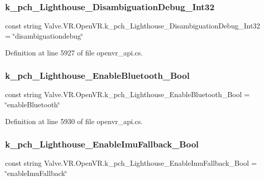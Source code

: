 \subsubsection{\texorpdfstring{k\_pch\_Lighthouse\_DisambiguationDebug\_Int32}{k\_pch\_Lighthouse\_DisambiguationDebug\_Int32}}
{\footnotesize\ttfamily const string Valve.\+V\+R.\+Open\+V\+R.\+k\+\_\+pch\+\_\+\+Lighthouse\+\_\+\+Disambiguation\+Debug\+\_\+\+Int32 = \char`\"{}disambiguationdebug\char`\"{}}



Definition at line 5927 of file openvr\+\_\+api.\+cs.

\mbox{\label{class_valve_1_1_v_r_1_1_open_v_r_ad04a088975dfea94ba6fa8d2b0f29c22}} 
\subsubsection{\texorpdfstring{k\_pch\_Lighthouse\_EnableBluetooth\_Bool}{k\_pch\_Lighthouse\_EnableBluetooth\_Bool}}
{\footnotesize\ttfamily const string Valve.\+V\+R.\+Open\+V\+R.\+k\+\_\+pch\+\_\+\+Lighthouse\+\_\+\+Enable\+Bluetooth\+\_\+\+Bool = \char`\"{}enable\+Bluetooth\char`\"{}}



Definition at line 5930 of file openvr\+\_\+api.\+cs.

\mbox{\label{class_valve_1_1_v_r_1_1_open_v_r_a99c3437b4f05c33d135e09f6fb501683}} 
\subsubsection{\texorpdfstring{k\_pch\_Lighthouse\_EnableImuFallback\_Bool}{k\_pch\_Lighthouse\_EnableImuFallback\_Bool}}
{\footnotesize\ttfamily const string Valve.\+V\+R.\+Open\+V\+R.\+k\+\_\+pch\+\_\+\+Lighthouse\+\_\+\+Enable\+Imu\+Fallback\+\_\+\+Bool = \char`\"{}enable\+Imu\+Fallback\char`\"{}}




